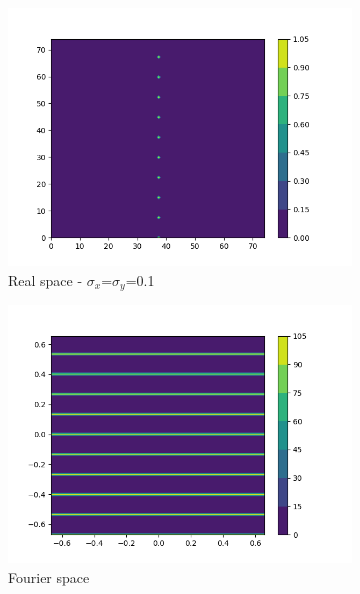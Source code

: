 \documentclass{article}
\begin{document}
\begin{figure}
	\begin{subfigure}{0.45\textwidth}
                \centering
                \includegraphics[width=\textwidth]{real_2d_74_1column.png}
                \caption{Real space - $\sigma_x$=$\sigma_y$=0.1}\label{fig:real_2d_74_1column}
        \end{subfigure}
        \begin{subfigure}{0.45\textwidth}
                \centering
                \includegraphics[width=\textwidth]{fourier_2d_74_1column.png}
                \caption{Fourier space}\label{fig:fourier_2d_74_1column}
        \end{subfigure}
	\begin{subfigure}{0.45\textwidth}

\end{subfigure}
\end{figure}
\end{document}
